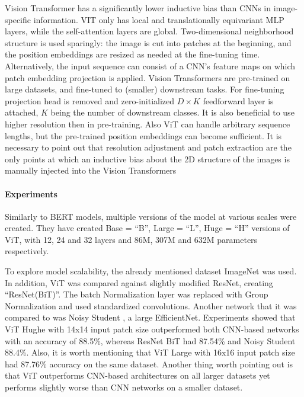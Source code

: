 \documentclass[
]{krantz}
\begin{document}
Vision Transformer has a significantly lower inductive bias than CNNs in image-specific information. VIT only has local and translationally equivariant MLP layers, while the self-attention layers are global. Two-dimensional neighborhood structure is used sparingly: the image is cut into patches at the beginning, and the position embeddings are resized as needed at the fine-tuning time. Alternatively, the input sequence can consist of a CNN's feature maps on which patch embedding projection is applied.
Vision Transformers are pre-trained on large datasets, and fine-tuned to (smaller) downstream tasks. For fine-tuning projection head is removed and zero-initialized \(D \times K\) feedforward layer is attached, \(K\) being the number of downstream classes. It is also beneficial to use higher resolution then in pre-training. Also ViT can handle arbitrary sequence lengths, but the pre-trained position embeddings can become sufficient. It is necessary to point out that resolution adjustment and patch extraction are the only points at which an inductive bias about the 2D structure of the images is manually injected into the Vision Transformers

\hypertarget{experiments}{%
\paragraph{Experiments}\label{experiments}}

Similarly to BERT models, multiple versions of the model at various scales were created. They have created Base = ``B'', Large = ``L'', Huge = ``H'' versions of ViT, with 12, 24 and 32 layers and 86M, 307M and 632M parameters respectively.

To explore model scalability, the already mentioned dataset ImageNet was used. In addition, ViT was compared against slightly modified ResNet, creating ``ResNet(BiT)''. The batch Normalization layer was replaced with Group Normalization and used standardized convolutions. Another network that it was compared to was Noisy Student \citet{noisy}, a large EfficientNet. Experiments showed that ViT Hughe with 14x14 input patch size outperformed both CNN-based networks with an accuracy of 88.5\%, whereas ResNet BiT had 87.54\% and Noisy Student 88.4\%. Also, it is worth mentioning that ViT Large with 16x16 input patch size had 87.76\% accuracy on the same dataset.
Another thing worth pointing out is that ViT outperforms CNN-based architectures on all larger datasets yet performs slightly worse than CNN networks on a smaller dataset.
\end{document}
